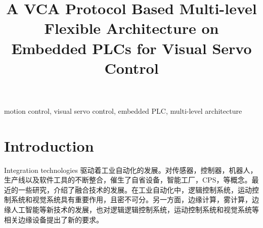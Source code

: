 \documentclass[journal,UTF8]{IEEEtran}
\begin{document}
%
\title{A VCA Protocol Based Multi-level Flexible Architecture on Embedded PLCs for Visual Servo Control }

\maketitle


\begin{abstract}

\end{abstract}

\begin{IEEEkeywords}
motion control, visual servo control, embedded PLC, multi-level architecture
\end{IEEEkeywords}

%
\IEEEpeerreviewmaketitle



\section{Introduction}
Integration technologies 驱动着工业自动化的发展\cite{Kazmierkowski2007Integration}。对传感器，控制器，机器人，生产线以及软件工具的不断整合，催生了自省设备，智能工厂，CPS，等概念\cite{Wan2018An,Chekired2018Industrial}。最近的一些研究，\cite{Colombo2006An,Vaccaro2010An,Dean2017Integration}介绍了融合技术的发展。在工业自动化中，逻辑控制系统，运动控制系统和视觉系统具有重要作用，且密不可分\cite{Feng2002Integrating,Chang2006Motion,Feng2005Practical}。另一方面，边缘计算，雾计算，边缘人工智能等新技术的发展\cite{Hu2017Fog,Hou2018Green,PaceAn}，也对逻辑逻辑控制系统，运动控制系统和视觉系统等相关边缘设备提出了新的要求。
\end{document}
